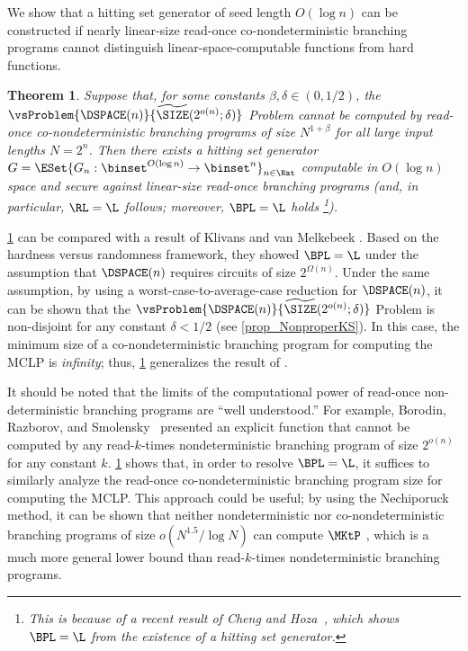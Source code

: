 \documentclass[11pt]{article}
\numberwithin{equation}{section}
\newtheorem{theorem}{Theorem}[section]
\theoremstyle{definition}
\theoremstyle{plain}
\begin{document}
We show that a hitting set generator of seed length $O(\log n)$ can be constructed
if
nearly linear-size read-once co-nondeterministic branching programs
cannot distinguish linear-space-computable functions
from
hard functions.

\begin{theorem}
  \label{thm_ROBP}
  Suppose that,
  for some constants $\beta, \delta \in (0, 1/2)$,
  the $\vsProblem{\DSPACE(n)} { \widetilde{\SIZE}(2^{o(n)}; \delta) }$ Problem cannot
  be computed by read-once co-nondeterministic branching programs of size $N^{1 + \beta}$
  for all large input lengths $N = 2^n$.
  Then there exists a hitting set generator $G = \ESet{ G_n : \binset^{O(\log n)} \allowbreak \to \binset^n }_{n \in \Nat} $ computable in $O(\log n)$ space and secure against linear-size read-once branching programs (and, in particular, $\RL = \L$ follows; moreover, $\BPL = \L$ holds%
  \footnote{This is because of a recent result of Cheng and Hoza~\cite{ChengH20_coco_conf}, which shows $\BPL = \L$
    from the existence of a hitting set generator.}).
\end{theorem}

\cref{thm_ROBP} can be compared with a result of
Klivans and van Melkebeek \cite{KlivansM02_siamcomp_journals}.
Based on the hardness versus randomness framework,
they showed
$\BPL = \L$
under the assumption that $\DSPACE(n)$ requires
%
circuits  %
of size $2^{\Omega(n)}$.
Under the same assumption, by using a worst-case-to-average-case reduction for $\DSPACE(n)$,
it can be shown that the
$\vsProblem{\DSPACE(n)} { \widetilde{\SIZE}(2^{o(n)}; \delta) }$ Problem
is non-disjoint for any constant $\delta < 1 / 2$
%
(see \cref{prop_NonproperKS}).   %
In this case, the minimum size of a co-nondeterministic branching program for computing the MCLP is \emph{infinity};
thus, \cref{thm_ROBP} generalizes the result of \cite{KlivansM02_siamcomp_journals}.

It should be noted that
the   %
limits of
the computational power of read-once non-deterministic branching programs
are ``well understood.''
For example,
Borodin, Razborov, and Smolensky~\cite{BorodinRS93_cc_journals}
presented an explicit function that cannot be computed by any read-$k$-times
nondeterministic branching program of size $2^{o(n)}$
for any constant $k$.
\cref{thm_ROBP} shows that,
in order to resolve $\BPL = \L$,
it suffices to similarly analyze the read-once co-nondeterministic branching program size for computing the MCLP.
This approach could be useful; by using the Nechiporuck method, it can be shown that
neither nondeterministic nor co-nondeterministic branching programs of size $o(N^{1.5}/\log N)$
can compute $\MKtP$ \cite{CheraghchiHMY20}, which is a much more general lower bound than read-$k$-times nondeterministic branching programs.
\end{document}
